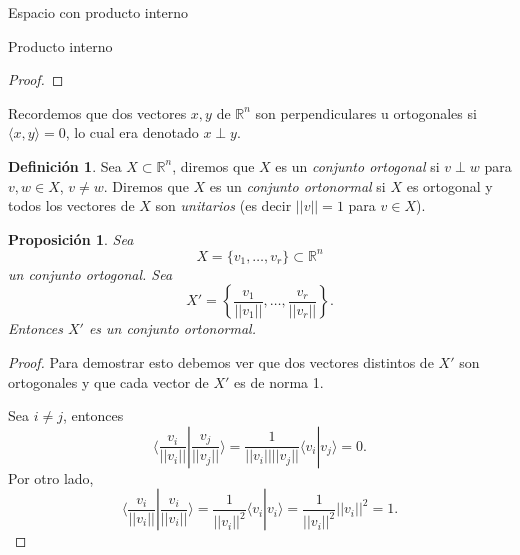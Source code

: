 \documentclass[a4paper,12pt,twoside,spanish,reqno]{amsbook}
\newtheorem{proposicion}[teorema]{Proposici\'on}
\theoremstyle{definition}
\newtheorem{definicion}{Definici\'on}[section]
\theoremstyle{remark}
\newcommand{\la}{\langle}
\newcommand{\ra}{\rangle}
\newcommand{\R}{\mathbb R}
\begin{document}
\begin{chapter}{Espacio con producto interno}
\begin{section}{Producto interno}
\begin{proof}
            
        \end{proof}
        
        \medskip
        
        Recordemos que dos vectores $x,y$  de $\R^n$ son perpendiculares u ortogonales si $\la x,y\ra =0$, lo cual era denotado $x \perp y$. 
        
        \begin{definicion} Sea $X \subset \R^n$, diremos que $X$ es un \emph{conjunto ortogonal} si $v\perp w$ para $v,w \in X$, $v\not= w$. Diremos que $X$ es un \emph{conjunto ortonormal} si $X$ es ortogonal y todos los vectores de $X$ son  \textit{unitarios} (es decir $||v|| =1$ para $v \in X$).
        \end{definicion}
    
        
        \begin{proposicion}\label{ortogonal->ortonormal}
            Sea  $$X = \{v_1,\ldots,v_r \} \subset \R^n$$ un conjunto ortogonal. Sea 
            \begin{equation*}
                X' =  \left\{\frac{v_1}{||v_1||},\ldots,\frac{v_r}{||v_r||} \right\}.
            \end{equation*}
            Entonces $X'$ es  un conjunto ortonormal. 
        \end{proposicion}
        \begin{proof}
            Para demostrar esto debemos ver que dos vectores distintos de $X'$ son ortogonales y que cada vector de $X'$ es de norma 1.
            
            Sea $i \ne j$, entonces
            \begin{equation*}
            \la \frac{v_i}{||v_i||} | \frac{v_j}{||v_j||}\ra = \frac{1}{||v_i||||v_j||} \la v_i | v_j\ra = 0.
            \end{equation*}
            Por otro lado,
            \begin{equation*}
            \la \frac{v_i}{||v_i||} | \frac{v_i}{||v_i||}\ra = \frac{1}{||v_i||^2} \la v_i | v_i\ra=  \frac{1}{||v_i||^2}||v_i||^2 =1.
            \end{equation*}
        \end{proof}	
            
            
            
        
        
        \medskip
        

\end{section}
\end{chapter}
\end{document}
